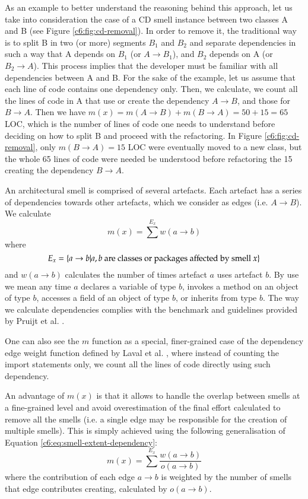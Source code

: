 As an example to better understand the reasoning behind this approach, let us take into consideration the case of a CD smell instance between two classes A and B (see Figure \ref{c6:fig:cd-removal}). In order to remove it, the traditional way \cite[p. 128]{Lippert2006} is to split B in two (or more) segments $B_1$ and $B_2$ and separate dependencies in such a way that A depends on $B_1$ (or $A \rightarrow B_1$), and $B_2$ depends on A (or $B_2 \rightarrow A$).
This process implies that the developer must be familiar with all dependencies between A and B. For the sake of the example, let us assume that each line of code contains one dependency only. Then, we calculate, we count all the lines of code in A that use or create the dependency $A \rightarrow B$, and those for $B \rightarrow A$. Then we have $m(x) = m(A \rightarrow B) + m(B \rightarrow A) = 50 + 15 = 65$ LOC, which is the number of lines of code one needs to understand before deciding on how to split B and proceed with the refactoring. In Figure \ref{c6:fig:cd-removal}, only $m(B \rightarrow A) = 15$ LOC were eventually moved to a new class, but the whole 65 lines of code were needed be understood before refactoring the 15 creating the dependency $B \rightarrow A$.

An architectural smell is comprised of several artefacts. Each artefact has a series of dependencies towards other artefacts, which we consider as edges (i.e. $A \rightarrow B$). We calculate 
\begin{equation}\label{c6:eq:smell-extent-dependency}
    m(x) = \sum^{E_x} w(a \rightarrow b)
\end{equation}
where $$E_x = \{a \rightarrow b | a,b\textnormal{ are classes or packages affected by smell } x\}$$ and $w(a\rightarrow b)$ calculates the number of times artefact $a$ uses artefact $b$. 
By use we mean any time $a$ declares a variable of type $b$, invokes a method on an object of type $b$, accesses a field of an object of type $b$, or inherits from type $b$.
The way we calculate dependencies complies with the benchmark and guidelines provided by Pruijt et al. \cite{Pruijt2017}.

One can also see the $m$ function as a special, finer-grained case of the dependency edge weight function defined by Laval et al. \cite{Laval2012}, where instead of counting the import statements only, we count all the lines of code directly using such dependency.

An advantage of $m(x)$ is that it allows to handle the overlap between smells at a fine-grained level and avoid overestimation of the final effort calculated to remove all the smells (i.e. a single edge may be responsible for the creation of multiple smells). 
This is simply achieved using the following generalisation of Equation \ref{c6:eq:smell-extent-dependency}:
\begin{equation}\label{c6:eq:smell-extent-dependency-weight}
m(x) = \sum^{E_x} \frac{w(a\rightarrow b)}{o(a \rightarrow b)}
\end{equation}
where the contribution of each edge $a \rightarrow b$ is weighted by the number of smells that edge contributes creating, calculated by $o(a \rightarrow b)$.

